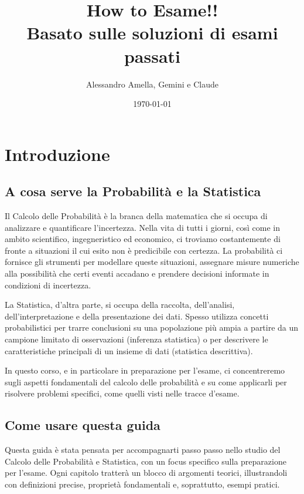 

\title{How to Esame!!\\
  \large Basato sulle soluzioni di esami passati}
\author{Alessandro Amella, Gemini e Claude}
\date{\today}



\maketitle
\tableofcontents
\newpage

\chapter{Introduzione}
\section{A cosa serve la Probabilità e la Statistica}
Il Calcolo delle Probabilità è la branca della matematica che si occupa di analizzare e quantificare l'incertezza. Nella vita di tutti i giorni, così come in ambito scientifico, ingegneristico ed economico, ci troviamo costantemente di fronte a situazioni il cui esito non è predicibile con certezza. La probabilità ci fornisce gli strumenti per modellare queste situazioni, assegnare misure numeriche alla possibilità che certi eventi accadano e prendere decisioni informate in condizioni di incertezza.

La Statistica, d'altra parte, si occupa della raccolta, dell'analisi, dell'interpretazione e della presentazione dei dati. Spesso utilizza concetti probabilistici per trarre conclusioni su una popolazione più ampia a partire da un campione limitato di osservazioni (inferenza statistica) o per descrivere le caratteristiche principali di un insieme di dati (statistica descrittiva).

In questo corso, e in particolare in preparazione per l'esame, ci concentreremo sugli aspetti fondamentali del calcolo delle probabilità e su come applicarli per risolvere problemi specifici, come quelli visti nelle tracce d'esame.

\section{Come usare questa guida}
Questa guida è stata pensata per accompagnarti passo passo nello studio del Calcolo delle Probabilità e Statistica, con un focus specifico sulla preparazione per l'esame. Ogni capitolo tratterà un blocco di argomenti teorici, illustrandoli con definizioni precise, proprietà fondamentali e, soprattutto, esempi pratici.

